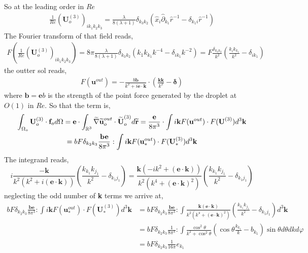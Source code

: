 So at the leading order in $Re$
\begin{align*}
    \frac{1}{Re}(\textbf{U}^{(3)}_o)_{ik_1k_2k_3}
    =
    \frac{\lambda}{8(\lambda+1)} \delta_{k_3 k_2 } ( \hat{x}_i\hat{\partial}_{k_1} \hat{r}^{-1}
    - \delta_{k_1 i} \hat{r}^{-1})
\end{align*}
The Fourier transform of that field reads,
\begin{align}
    F(\frac{1}{Re}(\textbf{U}^{(3)}_o)_{ik_1k_2k_3}) =
    8\pi \frac{\lambda}{8(\lambda+1)} \delta_{k_3 k_2 } (
        k_1 k_{k_1} k^{-4}
        - \delta_{i k_1} k^{-2}
    )
    =
    F\frac{\delta_{k_3k_2}}{k^2}\left(
        \frac{k_ik_{k_1}}{k^2}
        -\delta_{ik_1}
    \right)
\end{align}
the outter sol reads, 
\begin{align}
    F(\textbf{u}^{out})
    = 
    -\frac{b\textbf{b}}{k^2  + i \textbf{e}\cdot \textbf{k}}\cdot (\frac{\textbf{kk}}{k^2} - \bm\delta)
\end{align}
where $\textbf{b} = \textbf{e}b$ is the strength of the point force generated by the droplet at $O(1)$ in $Re$.
So that the term is,
\begin{multline}
    \intO[o]{\textbf{U}_{o}^{(3)}\cdot \textbf{f}_{o}}
    =
    \textbf{e}\cdot 
    \int_{\mathbb{R}^3}  \widetilde{\grad}  \widetilde{\textbf{u}}_{o}^{out}\cdot \widetilde{\textbf{U}}_{o}^{(3)} d\widetilde{\textbf{r}}
    =
    \frac{\textbf{e}}{8\pi^3}\cdot \int
    i \textbf{k} F(\textbf{u}^{out}) \cdot F(\textbf{U}^{(3)}) d^3 \textbf{k}\\
    =
    b F \delta_{k_2k_3}\frac{\textbf{be}}{8\pi^3} : \int
    i \textbf{k} F(\textbf{u}^{out}_*) \cdot F(\textbf{U}^{(3)}_*) d^3 \textbf{k}
\end{multline}
The integrand reads, 
\begin{equation*}
    i \frac{- \textbf{k}}{k^2(k^2  + i (\textbf{e}\cdot \textbf{k}))} (\frac{k_{k_1}k_{j_1}}{k^2} - \delta_{k_1j_1})   
    =
    \frac{ \textbf{k}(-ik^2  + (\textbf{e}\cdot \textbf{k}))}{k^2(k^4  + (\textbf{e}\cdot \textbf{k})^2)} (\frac{k_{k_1}k_{j_1}}{k^2} - \delta_{k_1j_1})   
\end{equation*}
neglecting the odd number of \textbf{k} terms we arrive at, 
\begin{align}
    b F \delta_{k_2k_3}\frac{\textbf{be}}{8\pi^3} : \int
    i \textbf{k} F(\textbf{u}^{out}_*) \cdot F(\textbf{U}^{(3)}_*) d^3 \textbf{k}
    &=
    b F \delta_{k_2k_3}\frac{\textbf{be}}{8\pi^3} : 
    \int
    \frac{ \textbf{k} (\textbf{e}\cdot \textbf{k})}{k^2(k^4  + (\textbf{e}\cdot \textbf{k})^2)} (\frac{k_{k_1}k_{j_1}}{k^2} - \delta_{k_1j_1})  d^3 \textbf{k}\\
    &=
    b F \delta_{k_2k_3}\frac{1}{8\pi^3} : 
    \int
    \frac{ \cos^2\theta }{k^2  +  \cos^2\theta} (\cos\theta\frac{k_{k_1}}{k} - b_{k_1})  \sin\theta d\theta dk d\varphi\\
    &=
    b F \delta_{k_2k_3}\frac{1}{16\pi} e_{k_1} 
    \\
\end{align}
